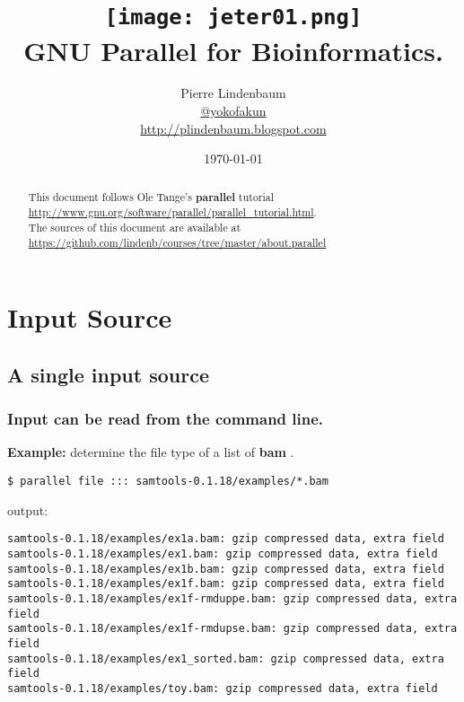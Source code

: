\documentclass{article}
\date{\today}
\title{\texttt{[image: jeter01.png]}\\GNU Parallel for Bioinformatics.}
\author{Pierre Lindenbaum\\\href{https://twitter.com/yokofakun}{@yokofakun}\\\url{http://plindenbaum.blogspot.com}}
\newcommand{\example}[1]{
\textbf{Example: } {\color[rgb]{0,0,1} #1 } .
}
\def\prl{\textbf{parallel}}
\def\bam{\textbf{bam}}
\begin{document}
\maketitle
\begin{abstract}
This document follows Ole Tange's \prl{} tutorial \url{http://www.gnu.org/software/parallel/parallel_tutorial.html}.\\The sources of this document are available at \url{https://github.com/lindenb/courses/tree/master/about.parallel}
\end{abstract}

\tableofcontents

\section{Input Source}
\subsection{A single input source}
\subsubsection{Input can be read from the command line.}

\example{determine the file type of a list of \bam{}}
\begin{lstlisting}
$ parallel file ::: samtools-0.1.18/examples/*.bam
\end{lstlisting}
output:
\begin{lstlisting}
samtools-0.1.18/examples/ex1a.bam: gzip compressed data, extra field
samtools-0.1.18/examples/ex1.bam: gzip compressed data, extra field
samtools-0.1.18/examples/ex1b.bam: gzip compressed data, extra field
samtools-0.1.18/examples/ex1f.bam: gzip compressed data, extra field
samtools-0.1.18/examples/ex1f-rmduppe.bam: gzip compressed data, extra field
samtools-0.1.18/examples/ex1f-rmdupse.bam: gzip compressed data, extra field
samtools-0.1.18/examples/ex1_sorted.bam: gzip compressed data, extra field
samtools-0.1.18/examples/toy.bam: gzip compressed data, extra field
\end{lstlisting}
\end{document}
